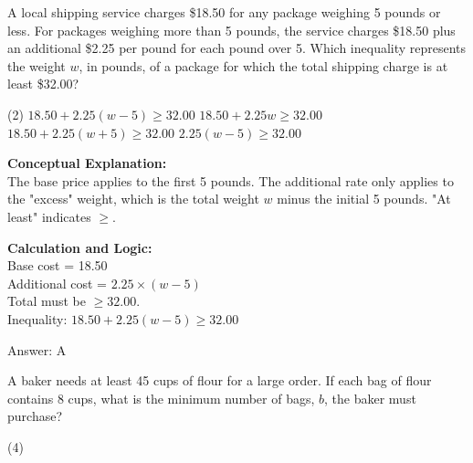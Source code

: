 \documentclass[11pt,paper=a4,answers]{exam}
\begin{document}
\begin{questions}
\pointsinrightmargin
\pointsdroppedatright
\marksnotpoints
{}
\pointformat{\boldmath\themarginpoints}
\bracketedpoints

\question
A local shipping service charges \$18.50 for any package weighing 5 pounds or less. For packages weighing more than 5 pounds, the service charges \$18.50 plus an additional \$2.25 per pound for each pound over 5. Which inequality represents the weight $w$, in pounds, of a package for which the total shipping charge is at least \$32.00?
\begin{tasks}(2)
    \task $18.50 + 2.25(w - 5) \ge 32.00$
    \task $18.50 + 2.25w \ge 32.00$
    \task $18.50 + 2.25(w + 5) \ge 32.00$
    \task $2.25(w - 5) \ge 32.00$
\end{tasks}

\begin{solution}
\textbf{Conceptual Explanation:} \\
The base price applies to the first 5 pounds. The additional rate only applies to the "excess" weight, which is the total weight $w$ minus the initial 5 pounds. "At least" indicates $\ge$.

\vspace{10pt}
\textbf{Calculation and Logic:} \\
Base cost = 18.50 \\
Additional cost = $2.25 \times (w - 5)$ \\
Total must be $\ge 32.00$. \\
Inequality: $18.50 + 2.25(w - 5) \ge 32.00$

\vspace{15pt}
Answer: \colorbox{yellow!100}{A}
\end{solution}

\vspace{20pt}

\question
A baker needs at least 45 cups of flour for a large order. If each bag of flour contains 8 cups, what is the minimum number of bags, $b$, the baker must purchase?
\begin{tasks}(4)
\end{tasks}


\end{questions}
\end{document}
